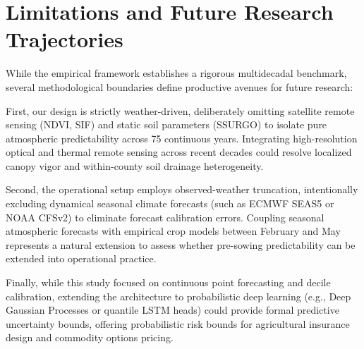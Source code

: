 \section{Limitations and Future Research Trajectories}
\label{sec:disc_limitations}

While the empirical framework establishes a rigorous multidecadal benchmark, several methodological boundaries define productive avenues for future research:

First, our design is strictly weather-driven, deliberately omitting satellite remote sensing (NDVI, SIF) and static soil parameters (SSURGO) to isolate pure atmospheric predictability across 75 continuous years. Integrating high-resolution optical and thermal remote sensing across recent decades could resolve localized canopy vigor and within-county soil drainage heterogeneity.

Second, the operational setup employs observed-weather truncation, intentionally excluding dynamical seasonal climate forecasts (such as ECMWF SEAS5 or NOAA CFSv2) to eliminate forecast calibration errors. Coupling seasonal atmospheric forecasts with empirical crop models between February and May represents a natural extension to assess whether pre-sowing predictability can be extended into operational practice.

Finally, while this study focused on continuous point forecasting and decile calibration, extending the architecture to probabilistic deep learning (e.g., Deep Gaussian Processes or quantile LSTM heads) could provide formal predictive uncertainty bounds, offering probabilistic risk bounds for agricultural insurance design and commodity options pricing.
